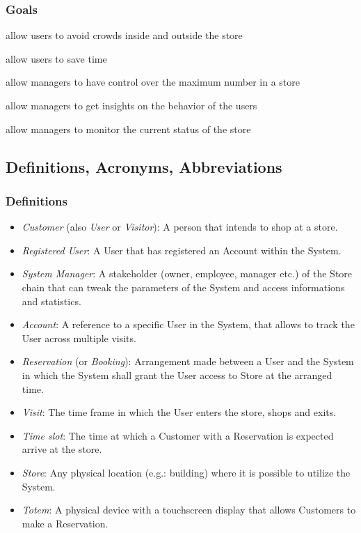\subsubsection{Goals}
\begin{enumerate}[label={[G\arabic*]}]
    \item allow users to avoid crowds inside and outside the store
    \item allow users to save time
    \item allow managers to have control over the maximum number in a store
    \item allow managers to get insights on the behavior of the users
    \item allow managers to monitor the current status of the store
\end{enumerate}

\subsection{Definitions, Acronyms, Abbreviations}

\subsubsection{Definitions}
\begin{itemize}
    \item \emph{Customer} (also \emph{User} or \emph{Visitor}): A person that intends to shop at a store.
    \item \emph{Registered User}: A User that has registered an Account within the System.
    \item \emph{System Manager}: A stakeholder (owner, employee, manager etc.) of the Store chain that can tweak the parameters of the System and access informations and statistics.
    \item \emph{Account}: A reference to a specific User in the System, that allows to track the User across multiple visits.
    \item \emph{Reservation} (or \emph{Booking}): Arrangement made between a User and the System in which the System shall grant the User access to Store at the arranged time.
    \item \emph{Visit}: The time frame in which the User enters the store, shops and exits.
    \item \emph{Time slot}: The time at which a Customer with a Reservation is expected arrive at the store.
    \item \emph{Store}: Any physical location (e.g.: building) where it is possible to utilize the System.
    \item \emph{Totem}: A physical device with a touchscreen display that allows Customers to make a Reservation.
\end{itemize}

